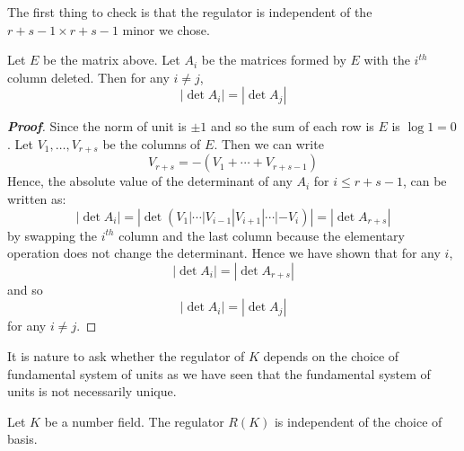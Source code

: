 The first thing to check is that the regulator is independent of the $r+s-1\times r+s-1$ minor we chose.
\begin{proposition} Let $E$ be the matrix above. Let $A_i$ be the matrices formed by $E$ with the $i^{th}$
column deleted. Then for any $i \neq j$,
$$|\det{A_i}|=|\det{A_j}|$$
\end{proposition}
\begin{proof}[\bf Proof] Since the norm of unit is $\pm1$ and so the sum of each row is $E$ is $\log{1}=0$. Let $V_1,\ldots,V_{r+s}$ be the columns of $E$. Then we can write
$$V_{r+s}=-(V_1+\cdots+V_{r+s-1})$$
Hence, the absolute value of the determinant of any $A_i$ for $i \le r+s-1$, can be written as:
$$|\det{A_i}|=|\det{(V_1|\cdots|V_{i-1}|V_{i+1}|\cdots|-V_i)}|=|\det{A_{r+s}}|$$
by swapping the $i^{th}$ column and the last column because the elementary operation does not change the determinant. Hence we have shown that for any $i$,
$$|\det{A_i}|=|\det{A_{r+s}}|$$
and so
$$|\det{A_i}|=|\det{A_{j}}|$$
for any $i \neq j$.
\end{proof}
It is nature to ask whether the regulator of $K$ depends on the choice of fundamental system of units as we have
seen that the fundamental system of units is not necessarily unique.
\begin{proposition} Let $K$ be a number field. The regulator $R(K)$ is independent of the choice of basis.
\end{proposition}
